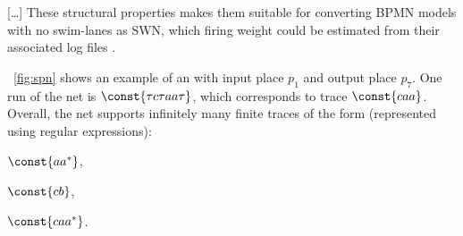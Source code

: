 [\dots] These structural properties makes them suitable for converting BPMN models with no swim-lanes as SWN, which firing weight could be estimated from their associated log files \cite{spdwe}. 
\begin{example} %
	\label{ex:net}
	\figurename~\ref{fig:spn} shows an example of an \uswn with input place $p_1$ and output place $p_7$. One run of the net is $\const{\tau c \tau a a \tau}$, which corresponds to trace $\const{caa}$. Overall, the net supports infinitely many finite traces of the form (represented using regular expressions):
	\begin{inparaenum}[\it (i)]
		\item $\const{aa^*}$,
		\item $\const{cb}$,
		\item $\const{caa^*}$.
	\end{inparaenum}
\end{example}

